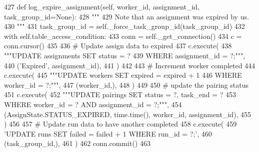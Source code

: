 \begin{DoxyCode}
427     \textcolor{keyword}{def }log\_expire\_assignment(self, worker\_id, assignment\_id, task\_group\_id=None):
428         \textcolor{stringliteral}{"""}
429 \textcolor{stringliteral}{        Note that an assignment was expired by us.}
430 \textcolor{stringliteral}{        """}
431         task\_group\_id = self.\_force\_task\_group\_id(task\_group\_id)
432         with self.table\_access\_condition:
433             conn = self.\_get\_connection()
434             c = conn.cursor()
435 
436             \textcolor{comment}{# Update assign data to expired}
437             c.execute(
438                 \textcolor{stringliteral}{"""UPDATE assignments SET status = ?}
439 \textcolor{stringliteral}{                         WHERE assignment\_id = ?;"""},
440                 (\textcolor{stringliteral}{'Expired'}, assignment\_id),
441             )
442 
443             \textcolor{comment}{# Increment worker completed}
444             c.execute(
445                 \textcolor{stringliteral}{"""UPDATE workers SET expired = expired + 1}
446 \textcolor{stringliteral}{                         WHERE worker\_id = ?;"""},
447                 (worker\_id,),
448             )
449 
450             \textcolor{comment}{# update the pairing status}
451             c.execute(
452                 \textcolor{stringliteral}{"""UPDATE pairings SET status = ?, task\_end = ?}
453 \textcolor{stringliteral}{                         WHERE worker\_id = ? AND assignment\_id = ?;"""},
454                 (AssignState.STATUS\_EXPIRED, time.time(), worker\_id, assignment\_id),
455             )
456 
457             \textcolor{comment}{# Update run data to have another completed}
458             c.execute(
459                 \textcolor{stringliteral}{'UPDATE runs SET failed = failed + 1 WHERE run\_id = ?;'},
460                 (task\_group\_id,),
461             )
462             conn.commit()
463 
\end{DoxyCode}
\mbox{\label{classparlai_1_1mturk_1_1core_1_1mturk__data__handler_1_1MTurkDataHandler_a2e2a4005391d49b70050c73315424f5a}} 
